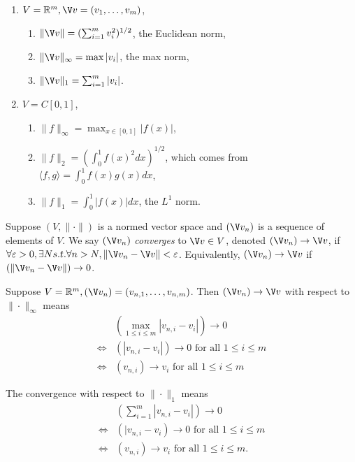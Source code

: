 \documentclass[a4paper]{article}
\theoremstyle{definition}
\begin{document}
\begin{eg}\leavevmode
  \begin{enumerate}
  \item $V= \mathbb{R}^m, \V v = (v_1,\ldots,v_m)$,
    \begin{enumerate}
    \item $\|\V v\| = (\sum_{i=1}^m v_i^2)^{1/2}$, the Euclidean norm,
    \item $\|\V v\|_\infty = \max |v_i|$, the max norm,
      \item $\|\V v\|_1 = \sum_{i=1}^m |v_i|$.
    \end{enumerate}
  \item $V=C[0,1]$,
    \begin{enumerate}
    \item $\|f\|_\infty=\max_{x\in[0,1]} |f(x)|$,
    \item $\|f\|_2=(\int_0^1 f(x)^2 dx)^{1/2}$, which comes from $\langle f,g\rangle = \int_0^1f(x)g(x) dx$,
      \item $\|f\|_1=\int_0^1|f(x)| dx$, the $L^1$ norm.
    \end{enumerate}
  \end{enumerate}
\end{eg}

\begin{definition}[Convergence]
  Suppose $(V, \|\cdot\|)$ is a normed vector space and $(\V v_n)$ is a sequence of elements of $V$. We say $(\V v_n)$ \emph{converges} to $\V v\in V$, denoted $(\V v_n)\to \V v$, if $\forall\varepsilon>0,\exists N s.t. \forall n>N, \|\V v_n-\V v\|<\varepsilon$. Equivalently, $(\V v_n)\to \V v$ if $(\|\V v_n-\V v\|)\to 0$.
\end{definition}

\begin{ex}
  Suppose $V=\mathbb{R}^m, (\V v_n) = (v_{n,1},\ldots,v_{n,m})$. Then $(\V v_n)\to \V v$ with respect to $\|\cdot\|_\infty$ means
  \begin{align*}
    & \left( \max_{1\leq i \leq m}|v_{n,i}-v_i| \right) \to 0 \\
    \Longleftrightarrow & (|v_{n,i}-v_i|)\to 0 \text{ for all } 1\leq i\leq m \\
    \Longleftrightarrow & (v_{n,i})\to v_i \text{ for all } 1\leq i\leq m
  \end{align*}

   The convergence with respect to $\|\cdot\|_1$ means
   \begin{align*}
     & \left( \sum_{i=1}^m |v_{n,i}-v_i| \right) \to 0 \\
     \Longleftrightarrow & \left( |v_{n,i}-v_i \right)\to 0 \text{ for all } 1\leq i\leq m \\ 
    \Longleftrightarrow & (v_{n,i})\to v_i \text{ for all } 1\leq i\leq m.
  \end{align*}
\end{ex}
\end{document}
